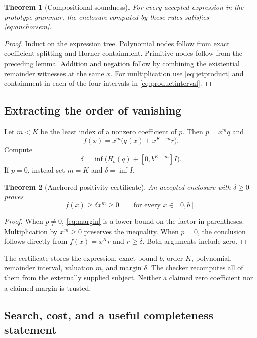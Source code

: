 \documentclass[11pt,a4paper]{article}
\newtheorem{theorem}{Theorem}[section]
\theoremstyle{definition}\newtheorem{definition}[theorem]{Definition}
\begin{document}
\begin{theorem}[Compositional soundness]
For every accepted expression in the prototype grammar, the enclosure computed
by these rules satisfies \eqref{eq:anchorsem}.
\end{theorem}
\begin{proof}
Induct on the expression tree. Polynomial nodes follow from exact coefficient
splitting and Horner containment. Primitive nodes follow from the preceding
lemma. Addition and negation follow by combining the existential remainder
witnesses at the same $x$. For multiplication use \eqref{eq:jetproduct} and
containment in each of the four intervals in \eqref{eq:productinterval}.
\end{proof}

\subsection{Extracting the order of vanishing}

Let $m<K$ be the least index of a nonzero coefficient of $p$. Then
$p=x^mq$ and
\[
 f(x)=x^m\bigl(q(x)+x^{K-m}r\bigr).
\]
Compute
\begin{equation}\label{eq:margin}
 \delta=\inf\bigl(H_b(q)+[0,b^{K-m}]I\bigr).
\end{equation}
If $p=0$, instead set $m=K$ and $\delta=\inf I$.

\begin{theorem}[Anchored positivity certificate]\label{thm:anchored}
An accepted enclosure with $\delta\ge0$ proves
\[
 f(x)\ge\delta x^m\ge0\qquad\text{for every }x\in[0,b].
\]
\end{theorem}
\begin{proof}
When $p\ne0$, \eqref{eq:margin} is a lower bound on the factor in parentheses.
Multiplication by $x^m\ge0$ preserves the inequality. When $p=0$, the conclusion
follows directly from $f(x)=x^Kr$ and $r\ge\delta$. Both arguments include zero.
\end{proof}

The certificate stores the expression, exact bound $b$, order $K$, polynomial,
remainder interval, valuation $m$, and margin $\delta$. The checker recomputes
all of them from the externally supplied subject. Neither a claimed zero
coefficient nor a claimed margin is trusted.

\subsection{Search, cost, and a useful completeness statement}
\end{document}
